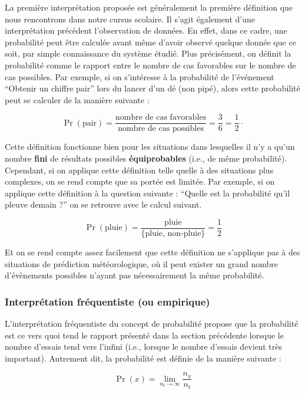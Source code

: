 \documentclass[
  a4paper,11pt,twoside,onecolumn,openright,final,oldfontcommands]{memoir}
\theoremstyle{definition}
\theoremstyle{definition}
\theoremstyle{definition}
\theoremstyle{remark}
\begin{document}
La première interprétation proposée est généralement la première définition que nous rencontrons dans notre cursus scolaire. Il s'agit également d'une interprétation précédent l'observation de données. En effet, dans ce cadre, une probabilité peut être calculée avant même d'avoir observé quelque donnée que ce soit, par simple connaissance du système étudié. Plus précisément, on définit la probabilité comme le rapport entre le nombre de cas favorables sur le nombre de cas possibles. Par exemple, si on s'intéresse à la probabilité de l'événement ``Obtenir un chiffre pair'' lors du lancer d'un dé (non pipé), alors cette probabilité peut se calculer de la manière suivante :

\[
\Pr(\text{pair}) = \frac{\text{nombre de cas favorables}}{\text{nombre de cas possibles}} = \frac{3}{6} = \frac{1}{2} \cdot
\]

Cette définition fonctionne bien pour les situations dans lesquelles il n'y a qu'un nombre \textbf{fini} de résultats possibles \textbf{équiprobables} (i.e., de même probabilité). Cependant, si on applique cette définition telle quelle à des situations plus complexes, on se rend compte que sa portée est limitée. Par exemple, si on applique cette définition à la question suivante : ``Quelle est la probabilité qu'il pleuve demain ?'' on se retrouve avec le calcul suivant.

\[
\Pr(\text{pluie}) = \frac{\text{pluie}}{ \{\text{pluie, non-pluie} \} } = \frac{1}{2}
\]

Et on se rend compte assez facilement que cette définition ne s'applique pas à des situations de prédiction météorologique, où il peut exister un grand nombre d'évènements possibles n'ayant pas nécessairement la même probabilité.

\hypertarget{interpruxe9tation-fruxe9quentiste-ou-empirique}{%
\subsubsection{Interprétation fréquentiste (ou empirique)}\label{interpruxe9tation-fruxe9quentiste-ou-empirique}}

L'interprétation fréquentiste du concept de probabilité propose que la probabilité est ce vers quoi tend le rapport présenté dans la section précédente lorsque le nombre d'essais tend vers l'infini (i.e., lorsque le nombre d'essais devient très important). Autrement dit, la probabilité est définie de la manière suivante :

\[\Pr(x) = \lim_{n_{t} \to \infty}\frac{n_{x}}{n_{t}}\]
\end{document}
